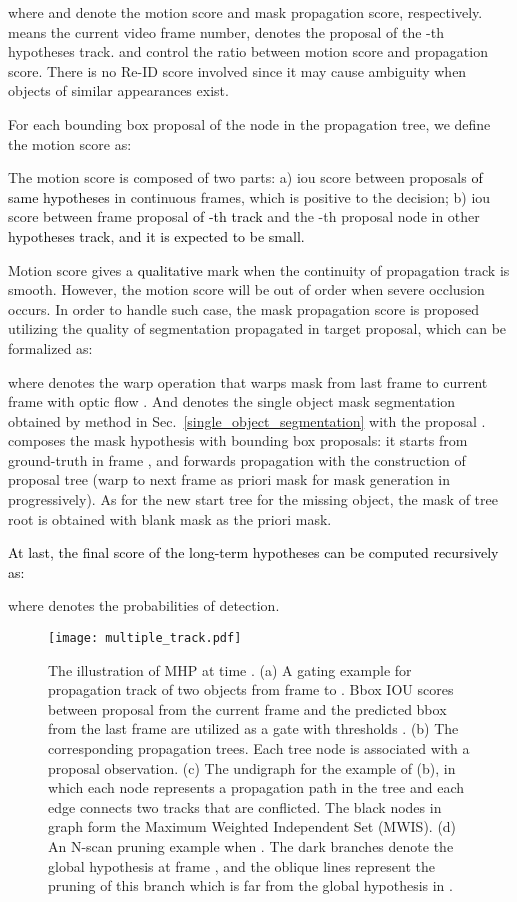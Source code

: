 \documentclass[10pt,twocolumn,letterpaper]{article}
\newcommand{\ldz}[1]{\textcolor{black}{#1}}
\begin{document}
where  and  denote the motion score and mask propagation score, respectively.  means the current video frame number,  denotes the proposal of the -th hypotheses track.  and  control the ratio between motion score and propagation score. There is no Re-ID score involved since it may cause ambiguity when objects of similar appearances exist.

For each bounding box proposal  of the node in the propagation tree, we define the motion score as:

The motion score is composed of two parts: a) iou score between proposals \ldz{of same hypotheses} in continuous frames, which is positive to the decision; b) iou score between frame  proposal \ldz{ of -th track} and the -th proposal node in other \ldz{hypotheses track}, \ldz{and it is expected to be small. }

Motion score gives a \ldz{qualitative} mark when the continuity of propagation track is smooth. However, the motion score will be out of order when severe occlusion occurs. In order to handle such case, the mask propagation score is proposed utilizing the quality of segmentation propagated in target proposal, which can be formalized as:

where  denotes the warp operation that warps mask from last frame to current frame with optic flow . And  denotes the single object mask segmentation obtained by method in Sec.~\ref{single_object_segmentation} with the proposal .  composes the mask hypothesis with bounding box proposals: it starts from ground-truth in frame , and forwards propagation with the construction of proposal tree (warp to next frame as priori mask for mask generation in  progressively). As for the new start tree for the missing object, the mask of tree root is obtained with blank mask as the priori mask.

\ldz{At last, the final score of the long-term hypotheses can be computed recursively as:}


where  denotes the probabilities of detection.



\begin{figure*}[t]
\vspace{-15pt}
\centering
\texttt{[image: multiple\_track.pdf]}
\vspace{-24pt}
\caption{The illustration of MHP at time . (a) A gating example for propagation track of two objects from frame  to . Bbox IOU scores between proposal from the current frame and the predicted bbox from the last frame are utilized as a gate with thresholds . (b) The corresponding propagation trees. Each tree node is associated with a proposal observation. (c) The undigraph for the example of (b), in which each node represents a propagation path in the tree and each edge connects two tracks that are conflicted. The black nodes in graph form the Maximum Weighted Independent Set (MWIS). (d) An N-scan pruning example when . The dark branches denote the global hypothesis at frame , and the oblique lines represent the pruning of this branch which is far from the global hypothesis in .} 
\label{fig:hypothesis}
\vspace{-7pt}
\end{figure*}
\end{document}
